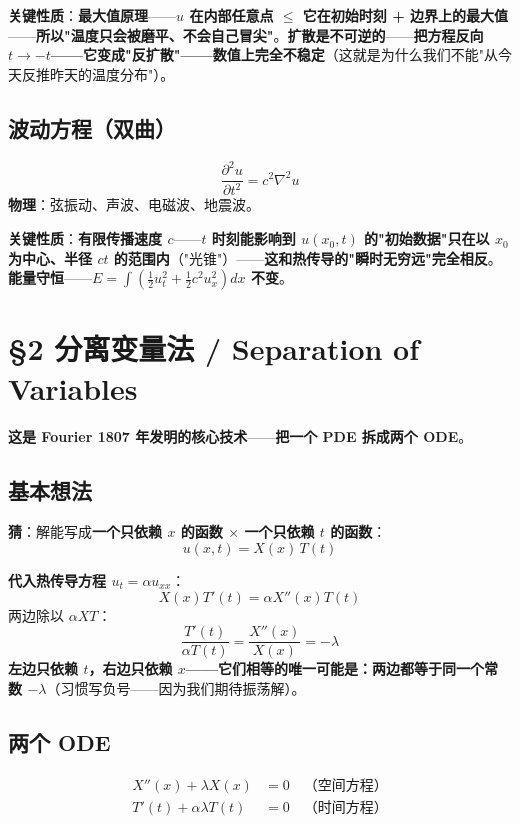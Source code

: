 \textbf{关键性质}：\textbf{最大值原理}——\textbf{$u$ 在内部任意点 $\le$ 它在初始时刻 + 边界上的最大值}——\textbf{所以"温度只会被磨平、不会自己冒尖"}。\textbf{扩散是不可逆的}——\textbf{把方程反向 $t \to -t$——它变成"反扩散"——数值上完全不稳定}（这就是为什么我们不能"从今天反推昨天的温度分布"）。

\subsection{波动方程（双曲）}
\begin{equation}
\frac{\partial^2 u}{\partial t^2} = c^2 \nabla^2 u
\end{equation}
\textbf{物理}：弦振动、声波、电磁波、地震波。

\textbf{关键性质}：\textbf{有限传播速度 $c$}——\textbf{$t$ 时刻能影响到 $u(x_0, t)$ 的"初始数据"只在以 $x_0$ 为中心、半径 $ct$ 的范围内}（"光锥"）——\textbf{这和热传导的"瞬时无穷远"完全相反}。\textbf{能量守恒}——\textbf{$E = \int (\tfrac{1}{2} u_t^2 + \tfrac{1}{2} c^2 u_x^2) dx$ 不变}。

\section{§2 分离变量法 / Separation of Variables}

\textbf{这是 Fourier 1807 年发明的核心技术}——\textbf{把一个 PDE 拆成两个 ODE}。

\subsection{基本想法}

\textbf{猜}：解能写成\textbf{一个只依赖 $x$ 的函数 $\times$ 一个只依赖 $t$ 的函数}：
\[
u(x, t) = X(x) \, T(t)
\]

\textbf{代入热传导方程 $u_t = \alpha u_{xx}$}：
\[
X(x) T'(t) = \alpha X''(x) T(t)
\]
两边除以 $\alpha X T$：
\[
\frac{T'(t)}{\alpha T(t)} = \frac{X''(x)}{X(x)} = -\lambda
\]
\textbf{左边只依赖 $t$，右边只依赖 $x$——\textbf{它们相等的唯一可能是}：\textbf{两边都等于同一个常数 $-\lambda$}}（习惯写负号——因为我们期待振荡解）。

\subsection{两个 ODE}

\begin{align}
X''(x) + \lambda X(x) &= 0 \quad \text{（空间方程）}\\
T'(t) + \alpha \lambda T(t) &= 0 \quad \text{（时间方程）}
\end{align}

